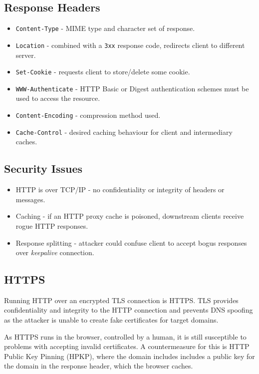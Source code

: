 \documentclass[11pt]{article}
\begin{document}
\subsection{Response Headers}
\begin{itemize}
  \item \texttt{Content-Type} - MIME type and character set of response.
  \item \texttt{Location} - combined with a \texttt{3xx} response code, redirects client to different server.
  \item \texttt{Set-Cookie} - requests client to store/delete some cookie.
  \item \texttt{WWW-Authenticate} - HTTP Basic or Digest authentication schemes must be used to access the resource.
  \item \texttt{Content-Encoding} - compression method used.
  \item \texttt{Cache-Control} - desired caching behaviour for client and intermediary caches.
\end{itemize}

\subsection{Security Issues}
\begin{itemize}
  \item HTTP is over TCP/IP - no confidentiality or integrity of headers or messages.
  \item Caching - if an HTTP proxy cache is poisoned, downstream clients receive rogue HTTP responses.
  \item Response splitting - attacker could confuse client to accept bogus responses over  \textit{keepalive} connection.
\end{itemize}

\subsection{HTTPS}
Running HTTP over an encrypted TLS connection is HTTPS.
TLS provides confidentiality and integrity to the HTTP connection and prevents DNS spoofing as the attacker is unable to create fake certificates for target domains.

As HTTPS runs in the browser, controlled by a human, it is still susceptible to problems with accepting invalid certificates.
A countermeasure for this is HTTP Public Key Pinning (HPKP), where the domain includes includes a public key for the domain in the response header, which the browser caches.
\end{document}

